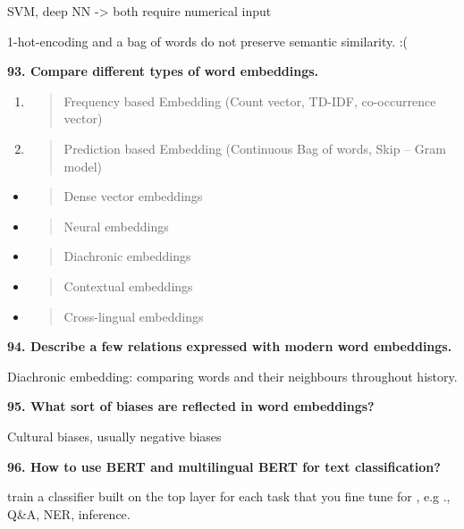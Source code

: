 SVM, deep NN -\textgreater{} both require numerical input

1-hot-encoding and a bag of words do not preserve semantic similarity.
:(

\textbf{93. Compare different types of word embeddings.}

\begin{enumerate}
\def\labelenumi{\arabic{enumi}.}
\item
  \begin{quote}
  Frequency based Embedding (Count vector, TD-IDF, co-occurrence vector)
  \end{quote}
\item
  \begin{quote}
  Prediction based Embedding (Continuous Bag of words, Skip -- Gram
  model)
  \end{quote}
\end{enumerate}

\begin{itemize}
\item
  \begin{quote}
  Dense vector embeddings
  \end{quote}
\item
  \begin{quote}
  Neural embeddings
  \end{quote}
\item
  \begin{quote}
  Diachronic embeddings
  \end{quote}
\item
  \begin{quote}
  Contextual embeddings
  \end{quote}
\item
  \begin{quote}
  Cross-lingual embeddings
  \end{quote}
\end{itemize}

\textbf{94. Describe a few relations expressed with modern word
embeddings.}

Diachronic embedding: comparing words and their neighbours throughout
history.

\textbf{95. What sort of biases are reflected in word embeddings?}

Cultural biases, usually negative biases

\textbf{96. How to use BERT and multilingual BERT for text
classification?}

train a classifier built on the top layer for each task that you fine
tune for , e.g ., Q\&A, NER, inference.

